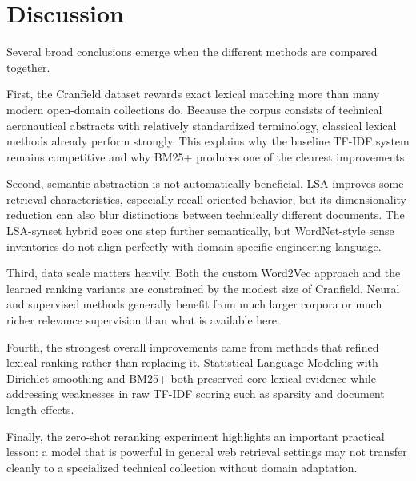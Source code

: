 \section{Discussion}\label{sec:discuss}

Several broad conclusions emerge when the different methods are compared together.

First, the Cranfield dataset rewards exact lexical matching more than many modern open-domain collections do. Because the corpus consists of technical aeronautical abstracts with relatively standardized terminology, classical lexical methods already perform strongly. This explains why the baseline TF-IDF system remains competitive and why BM25+ produces one of the clearest improvements.

Second, semantic abstraction is not automatically beneficial. LSA improves some retrieval characteristics, especially recall-oriented behavior, but its dimensionality reduction can also blur distinctions between technically different documents. The LSA-synset hybrid goes one step further semantically, but WordNet-style sense inventories do not align perfectly with domain-specific engineering language.

Third, data scale matters heavily. Both the custom Word2Vec approach and the learned ranking variants are constrained by the modest size of Cranfield. Neural and supervised methods generally benefit from much larger corpora or much richer relevance supervision than what is available here.

Fourth, the strongest overall improvements came from methods that refined lexical ranking rather than replacing it. Statistical Language Modeling with Dirichlet smoothing and BM25+ both preserved core lexical evidence while addressing weaknesses in raw TF-IDF scoring such as sparsity and document length effects.

Finally, the zero-shot reranking experiment highlights an important practical lesson: a model that is powerful in general web retrieval settings may not transfer cleanly to a specialized technical collection without domain adaptation.
